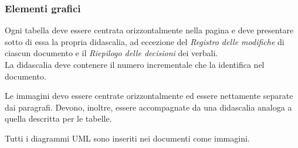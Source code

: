 \subsubsection{Elementi grafici}
Ogni tabella deve essere centrata orizzontalmente nella pagina e deve presentare sotto di essa la propria didascalia, ad eccezione del \textit{Registro delle modifiche} di ciascun documento e il \textit{Riepilogo delle decisioni} dei verbali. \\
La didascalia deve contenere il numero incrementale che la identifica nel documento.

Le immagini devo essere centrate orizzontalmente ed essere nettamente separate dai paragrafi. Devono, inoltre, essere accompagnate da una didascalia analoga a quella descritta per le tabelle.

Tutti i diagrammi UML sono inseriti nei documenti come immagini.